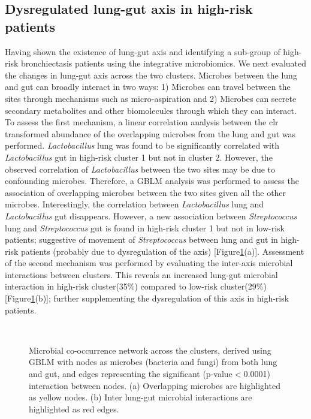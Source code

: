 \subsection{Dysregulated lung-gut axis in high-risk patients}
Having shown the existence of lung-gut axis and identifying a sub-group of high-risk bronchiectasis patients using the integrative microbiomics. We next evaluated the changes in lung-gut axis across the two clusters. Microbes between the lung and gut can broadly interact in two ways: 1) Microbes can travel between the sites through mechanisms such as micro-aspiration and 2) Microbes can secrete secondary metabolites and other biomolecules through which they can interact. To assess the first mechanism, a linear correlation analysis between the clr transformed abundance of the overlapping microbes from the lung and gut was performed. \emph{Lactobacillus} lung was found to be significantly correlated with  \emph{Lactobacillus} gut in high-risk cluster 1 but not in cluster 2. However, the observed correlation of \emph{Lactobacillus} between the two sites may be due to confounding microbes. Therefore, a GBLM analysis was performed to assess the association of overlapping microbes between the two sites given all the other microbes. Interestingly, the correlation between \emph{Lactobacillus} lung and \emph{Lactobacillus} gut disappears. However, a new association between \emph{Streptococcus} lung and \emph{Streptococcus} gut is found in high-risk cluster 1 but not in low-risk patients; suggestive of movement of \emph{Streptococcus} between lung and gut in high-risk patients (probably due to dysregulation of the axis) [Figure\ref{res2_fig5}(a)]. Assessment of the second mechanism was performed by evaluating the inter-axis microbial interactions between clusters. This reveals an increased lung-gut microbial interaction in high-risk cluster(35\%) compared to low-risk cluster(29\%) [Figure\ref{res2_fig5}(b)]; further supplementing the dysregulation of this axis in high-risk patients.

\begin{figure}[h]
	\centering
	\\
	\caption{Microbial co-occurrence network across the clusters, derived using GBLM with nodes as microbes (bacteria and fungi) from both lung and gut, and edges representing the significant (p-value$<$0.0001) interaction between nodes. (a) Overlapping microbes are highlighted as yellow nodes. (b) Inter lung-gut microbial interactions are highlighted as red edges.}
	\label{res2_fig5}
\end{figure}